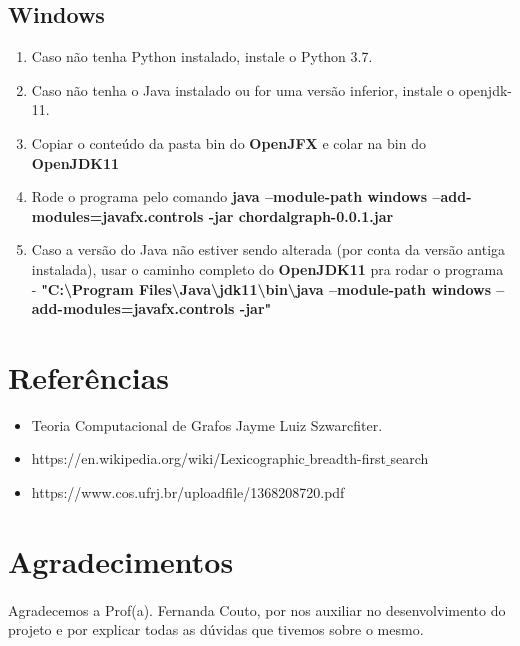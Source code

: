 \documentclass[a4paper, 11pt]{article}
\begin{document}
			\subsection{Windows}
			\begin{enumerate}
				\item Caso não tenha Python instalado, instale o Python 3.7.
				\item Caso não tenha o Java instalado ou for uma versão inferior, instale o openjdk-11.
				\item Copiar o conteúdo da pasta bin do \textbf{OpenJFX} e colar na bin do \textbf{OpenJDK11}
				
				\item Rode o programa pelo comando \textbf{java --module-path windows --add-modules=javafx.controls -jar chordalgraph-0.0.1.jar}
				
				\item Caso a versão do Java não estiver sendo alterada (por conta da versão antiga instalada), usar o caminho completo do \textbf{OpenJDK11} pra rodar o programa 
				- \textbf{"C:\textbackslash Program Files\textbackslash Java\textbackslash jdk11\textbackslash bin\textbackslash java --module-path windows --add-modules=javafx.controls -jar"}
				
				
			\end{enumerate}
		\section{Referências}	
			\begin{itemize}
				\item Teoria Computacional de Grafos
				Jayme Luiz Szwarcfiter.
				
				\item https://en.wikipedia.org/wiki/Lexicographic$\_$breadth-first$\_$search
				
				\item https://www.cos.ufrj.br/uploadfile/1368208720.pdf
				
			\end{itemize}
		\section{Agradecimentos}
			\paragraph{} Agradecemos a Prof(a). Fernanda Couto, por nos auxiliar no desenvolvimento do projeto e por explicar todas as dúvidas que tivemos sobre o mesmo.
\end{document}
